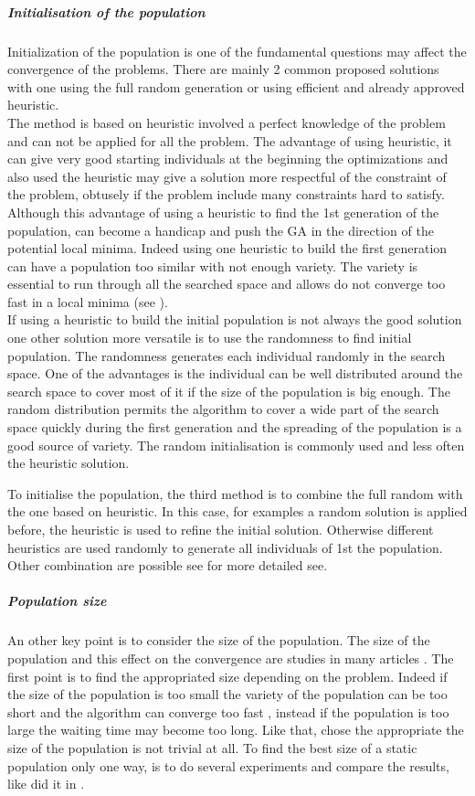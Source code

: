 \subparagraph{Initialisation of the population}\label{sec:initPOP}
Initialization of the population is one of the fundamental questions may affect the convergence of the problems. There are mainly 2 common proposed solutions with one using the full random generation or  using efficient and already approved heuristic.\\
 The method is based on heuristic involved a perfect knowledge  of the problem and can not be applied  for all the problem. The advantage of using heuristic, it can give very good starting individuals at the beginning the optimizations and also used the heuristic may give a solution more respectful of the constraint of the problem, obtusely if the problem include many constraints hard to satisfy. \\
Although this advantage of using a heuristic to find the 1st generation of the population, can become a handicap and push the GA in the direction of the potential local minima. Indeed using one heuristic to build the first generation can have a population too similar with not enough variety. The variety is essential to run through all the searched space and allows do not converge too fast in a local minima (see \citep{64*matsui1999}).\\
If using a heuristic to build the initial population is not always the good solution one other solution more versatile is to use the randomness to find initial population. The  randomness generates each individual randomly in the search space. One of the advantages is the individual can be well distributed around the search space to cover most of it  if the size of the population is big enough. 
The random  distribution permits the algorithm  to cover a wide part of the search space quickly during the first generation and the spreading of the population is a good source of variety.
The random initialisation is commonly used and less often the heuristic solution.

To initialise the population, the third method is to combine the full random with the one based on heuristic. 
In this case, for examples a random solution is applied before, the heuristic is used to refine the initial solution. Otherwise different heuristics are used randomly to generate all individuals of  1st the population. Other combination are possible  see \cite{113*mais2010} for more detailed see.

\subparagraph{Population size}
An other key point is to consider the size  of the population. The size of the population and this effect on the convergence are studies in many articles \cite{64*matsui1999,70*arabas1994,71*grefenstette1986,77*shi2005,97*goldberg1985,109*cerf1995}. 
The first point is to find the appropriated size depending on the problem. Indeed if the size of the population is too small the variety of the population can be too short and the algorithm can converge too fast \cite{70*arabas1994}, instead if the population is too large the waiting time may become too long.  
Like that, chose the appropriate the size of the population is not trivial at all. To find the best size of a static population only one way, is to do several experiments and compare the results, like did it in \cite{71*grefenstette1986}.

